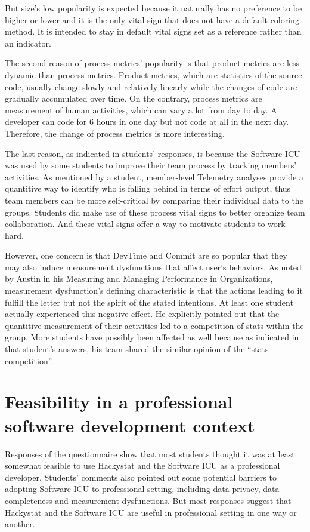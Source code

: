 But size's low popularity is expected because it naturally has no preference to be higher or lower and it is the only vital sign that does not have a default coloring method. It is intended to stay in default vital signs set as a reference rather than an indicator.

The second reason of process metrics' popularity is that product metrics are less dynamic than process metrics. Product metrics, which are statistics of the source code, usually change slowly and relatively linearly while the changes  of code are gradually accumulated over time. On the contrary, process metrics are measurement of human activities, which can vary a lot from day to day. A developer can code for 6 hours in one day but not code at all in the next day. Therefore, the change of process metrics is more interesting.

The last reason, as indicated in students' responses, is because the Software ICU was used by some students to improve their team process by tracking members' activities. As mentioned by a student, member-level Telemetry analyses provide a quantitive way to identify who is falling behind in terms of effort output, thus team members can be more self-critical by comparing their individual data to the groups. Students did make use of these process vital signs to better organize team collaboration. And these vital signs offer a way to motivate students to work hard.

However, one concern is that DevTime and Commit are so popular that they may also induce measurement dysfunctions that affect user's behaviors. As noted by Austin in his Measuring and Managing Performance in Organizations\cite{Austin96}, measurement dysfunction's defining characteristic is that the actions leading to it fulfill the letter but not the spirit of the stated intentions. At least one student actually experienced this negative effect. He explicitly pointed out that the quantitive measurement of their activities led to a competition of stats within the group. More students have possibly been affected as well because as indicated in that student's answers, his team shared the similar opinion of the ``stats competition''.

\section {Feasibility in a professional software development context}
Responses of the questionnaire show that most students thought it was at least somewhat feasible to use Hackystat and the Software ICU as a professional developer. Students' comments also pointed out some potential barriers to adopting Software ICU to professional setting, including data privacy, data completeness and measurement dysfunctions. But most responses suggest that Hackystat and the Software ICU are useful in professional setting in one way or another.

